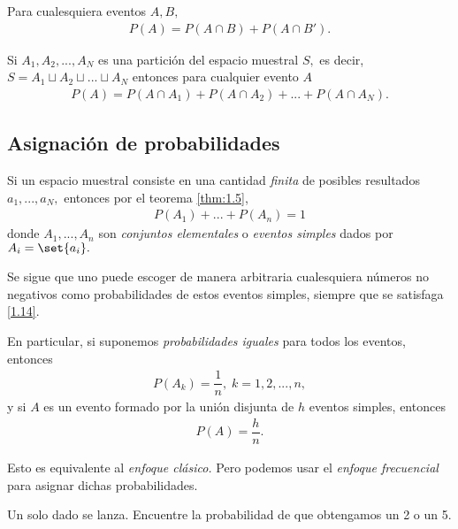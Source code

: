 {}
\begin{thm}
\label{thm:1.7}
 Para cualesquiera eventos $A,B,$
\begin{align}
 \label{1.12}
 P(A)=P(A\cap B)+P(A\cap B').
\end{align}
\end{thm}


{}
\begin{thm}
 \label{thm:1.8}
 Si $A_{1},A_{2},..., A_{N}$ es una partición del espacio muestral $S,$ es decir,
 $S=A_{1} \sqcup A_{2} \sqcup ... \sqcup A_{N}$ entonces para cualquier evento $A$
 \begin{align}
  \label{1.13}
  P(A)=P(A\cap A_{1})+ P(A\cap A_{2}) + ... +P(A\cap A_{N}).
 \end{align}
\end{thm}


\subsection{Asignación de probabilidades}
 {}
 Si un espacio muestral consiste en una cantidad \emph{finita} de posibles resultados $a_{1},...,a_{N},$ entonces por el teorema \ref{thm:1.5},
 \begin{align}
  \label{1.14}
  P(A_{1})+...+P(A_{n})=1
 \end{align}
 donde $A_{1},...,A_{n}$ son \emph{conjuntos elementales} o \emph{eventos simples} dados por $A_{i}=\set{a_{i}}.$


{}
Se sigue que uno puede escoger de manera arbitraria cualesquiera números no negativos como probabilidades de estos eventos simples, siempre que se satisfaga \eqref{1.14}. 

En particular, si suponemos \emph{probabilidades iguales} para todos los eventos, entonces
\begin{align}
 \label{1.15}
 P(A_{k})=\dfrac{1}{n}, \; k=1,2,...,n,
\end{align}
y si $A$ es un evento formado por la unión disjunta de $h$ eventos simples, entonces
\begin{align}
	\label{1.16}
 P(A)=\dfrac{h}{n}.
\end{align}


{}
\begin{rem}
 Esto es equivalente al \textit{enfoque clásico.} Pero podemos usar el \textit{enfoque frecuencial} para asignar dichas probabilidades.
\end{rem}


{}
\begin{exmp}
 \label{exmp:1.12}
 Un solo dado se lanza. Encuentre la probabilidad de que obtengamos un 2 o un 5.
\end{exmp}



